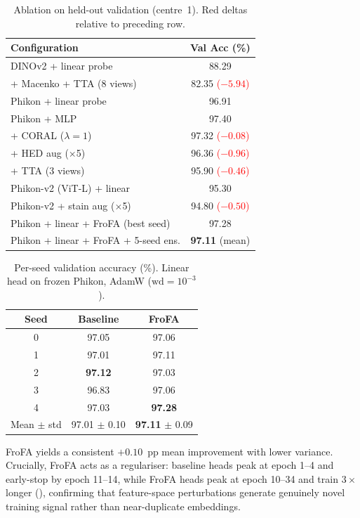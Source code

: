 \documentclass{midl}
\begin{document}
\begin{table}[htbp]
{\caption{Ablation on held-out validation (centre~1). Red deltas relative to preceding row.}}
{
\begin{tabular}{lc}
\toprule
\textbf{Configuration} & \textbf{Val Acc (\%)} \\
\midrule
DINOv2 + linear probe & 88.29 \\
\quad + Macenko + TTA (8 views) & 82.35 \textcolor{red}{\scriptsize($-5.94$)} \\
\midrule
Phikon + linear probe & 96.91 \\
Phikon + MLP & 97.40 \\
\quad + CORAL ($\lambda{=}1$) & 97.32 \textcolor{red}{\scriptsize($-0.08$)} \\
\quad + HED aug ($\times$5) & 96.36 \textcolor{red}{\scriptsize($-0.96$)} \\
\quad + TTA (3 views) & 95.90 \textcolor{red}{\scriptsize($-0.46$)} \\
\midrule
Phikon-v2 (ViT-L) + linear & 95.30 \\
Phikon-v2 + stain aug ($\times$5) & 94.80 \textcolor{red}{\scriptsize($-0.50$)} \\
\midrule
Phikon + linear + FroFA (best seed) & 97.28 \\
Phikon + linear + FroFA + 5-seed ens. & \textbf{97.11} \scriptsize(mean) \\
\bottomrule
\end{tabular}
}
\end{table}

\begin{table}[htbp]
{\caption{Per-seed validation accuracy (\%). Linear head on frozen Phikon, AdamW ($\text{wd}{=}10^{-3}$).}}
{
\begin{tabular}{ccc}
\toprule
\textbf{Seed} & \textbf{Baseline} & \textbf{FroFA} \\
\midrule
0 & 97.05 & 97.06 \\
1 & 97.01 & 97.11 \\
2 & \textbf{97.12} & 97.03 \\
3 & 96.83 & 97.06 \\
4 & 97.03 & \textbf{97.28} \\
\midrule
Mean $\pm$ std & 97.01 $\pm$ 0.10 & \textbf{97.11} $\pm$ 0.09 \\
\bottomrule
\end{tabular}
}
\end{table}

FroFA yields a consistent $+0.10$~pp mean improvement with lower variance.
Crucially, FroFA acts as a regulariser: baseline heads peak at epoch 1--4 and early-stop by epoch 11--14, while FroFA heads peak at epoch 10--34 and train $3\times$ longer (), confirming that feature-space perturbations generate genuinely novel training signal rather than near-duplicate embeddings.
\end{document}
